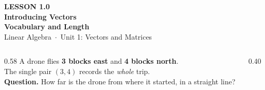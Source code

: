 \documentclass[aspectratio=169, 11pt]{beamer}
\begin{document}
{
\begin{frame}[plain]
  \vspace{2.8cm}\hspace{0.55cm}%
  \begin{minipage}{0.9\textwidth}
    {\color{goldacc}\bfseries\small LESSON 1.0}\\[0.5cm]
    {\color{white}\bfseries\LARGE Introducing Vectors}\\[0.3cm]
    {\color{white}\bfseries\large Vocabulary and Length}\\[1.0cm]
    {\color{blushmid}\small Linear Algebra~$\cdot$~Unit 1: Vectors and Matrices}
  \end{minipage}
\end{frame}
}

\begin{frame}[t, plain]
  \begin{columns}[T]
    \begin{column}{0.58\textwidth}
      A drone flies \textbf{3 blocks east} and \textbf{4 blocks north}.\\[6pt]
      The single pair $(3,4)$ records the \emph{whole} trip.\\[10pt]
      \textbf{Question.} How far is the drone from where it started, in a straight line?
    \end{column}
    \begin{column}{0.40\textwidth}
      \centering
    \end{column}
  \end{columns}
\end{frame}
\end{document}
